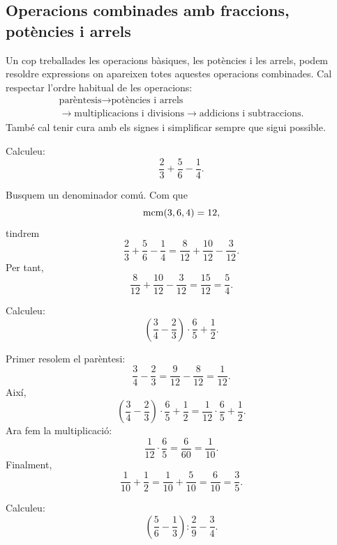 \subsection{Operacions combinades amb fraccions, potències i arrels}

Un cop treballades les operacions bàsiques, les potències i les arrels, podem resoldre expressions on apareixen totes aquestes operacions combinades. Cal respectar l'ordre habitual de les operacions:
\[
\begin{array}{c}
	\text{parèntesis}
	\longrightarrow
	\text{potències i arrels} \\[2mm]
	\longrightarrow
	\text{multiplicacions i divisions}
	\longrightarrow
	\text{addicions i subtraccions}.
\end{array}
\]
També cal tenir cura amb els signes i simplificar sempre que sigui possible.

\begin{exercici}
	Calculeu:
	\[
		\frac{2}{3}+\frac{5}{6}-\frac{1}{4}.
	\]
\end{exercici}

\begin{solucio}
	Busquem un denominador comú. Com que
	\[
		\operatorname{mcm}(3,6,4)=12,
	\]
	tindrem
	\[
		\frac{2}{3}+\frac{5}{6}-\frac{1}{4}
		=
		\frac{8}{12}+\frac{10}{12}-\frac{3}{12}.
	\]
	Per tant,
	\[
		\frac{8}{12}+\frac{10}{12}-\frac{3}{12}
		=
		\frac{15}{12}
		=
		\frac{5}{4}.
	\]
\end{solucio}

\begin{exercici}
	Calculeu:
	\[
		\left(\frac{3}{4}-\frac{2}{3}\right)\cdot\frac{6}{5}+\frac{1}{2}.
	\]
\end{exercici}

\begin{solucio}
	Primer resolem el parèntesi:
	\[
		\frac{3}{4}-\frac{2}{3}
		=
		\frac{9}{12}-\frac{8}{12}
		=
		\frac{1}{12}.
	\]
	Així,
	\[
		\left(\frac{3}{4}-\frac{2}{3}\right)\cdot\frac{6}{5}+\frac{1}{2}
		=
		\frac{1}{12}\cdot\frac{6}{5}+\frac{1}{2}.
	\]
	Ara fem la multiplicació:
	\[
		\frac{1}{12}\cdot\frac{6}{5}
		=
		\frac{6}{60}
		=
		\frac{1}{10}.
	\]
	Finalment,
	\[
		\frac{1}{10}+\frac{1}{2}
		=
		\frac{1}{10}+\frac{5}{10}
		=
		\frac{6}{10}
		=
		\frac{3}{5}.
	\]
\end{solucio}

\begin{exercici}
	Calculeu:
	\[
		\left(\frac{5}{6}-\frac{1}{3}\right):\frac{2}{9}-\frac{3}{4}.
	\]
\end{exercici}

